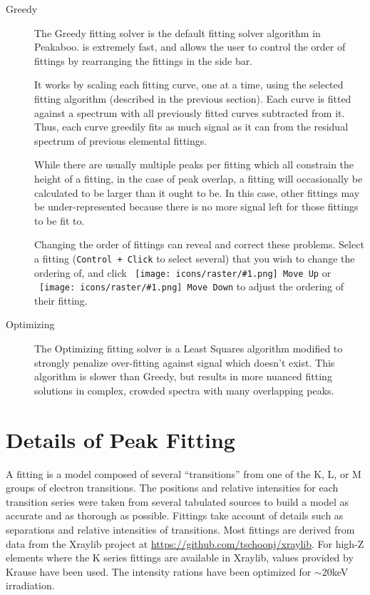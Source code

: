 \documentclass[article,twoside,11pt]{report}
\newcommand{\command}[1]{\texttt{#1}}
\newcommand{\icon}[1]{\texttt{[image: icons/raster/\#1.png]}}
\newcommand{\button}[2]{\ \command{\icon{#1} #2}}
\newcommand{\shortcut}[2]{\command{#1 + #2}}
\newcommand{\tocsection}[1]{\section*{#1}\addcontentsline{toc}{section}{#1}}
\begin{document}
\begin{description}

\item [Greedy] The Greedy fitting solver is the default fitting solver algorithm in Peakaboo. is extremely fast, and allows the user to control the order of fittings by rearranging the fittings in the side bar. 

It works by scaling each fitting curve, one at a time, using the selected fitting algorithm (described in the previous section). Each curve is fitted against a spectrum with all previously fitted curves subtracted from it. Thus, each curve greedily fits as much signal as it can from the residual spectrum of previous elemental fittings.

While there are usually multiple peaks per fitting which all constrain the height of a fitting, in the case of peak overlap, a fitting will occasionally be calculated to be larger than it ought to be. In this case, other fittings may be under-represented because there is no more signal left for those fittings to be fit to.

Changing the order of fittings can reveal and correct these problems. Select a fitting (\shortcut{Control}{Click} to select several) that you wish to change the ordering of, and click \button{go-up}{Move Up} or \button{go-down}{Move Down} to adjust the ordering of their fitting.


\item [Optimizing] The Optimizing fitting solver is a Least Squares algorithm modified to strongly penalize over-fitting against signal which doesn't exist. This algorithm is slower than Greedy, but results in more nuanced fitting solutions in complex, crowded spectra with many overlapping peaks.

\end{description}


\tocsection{Details of Peak Fitting}

A fitting is a model composed of several ``transitions'' from one of the K, L, or M groups of electron transitions. The positions and relative intensities for each transition series were taken from several tabulated sources to build a model as accurate and as thorough as possible. Fittings take account of details such as separations and relative intensities of transitions. Most fittings are derived from data from the Xraylib project at \url{https://github.com/tschoonj/xraylib}. For high-Z elements where the K series fittings are available in Xraylib, values provided by Krause 
\cite{kraus} have been used. The intensity rations have been optimized for $\sim$20keV irradiation.
\end{document}
